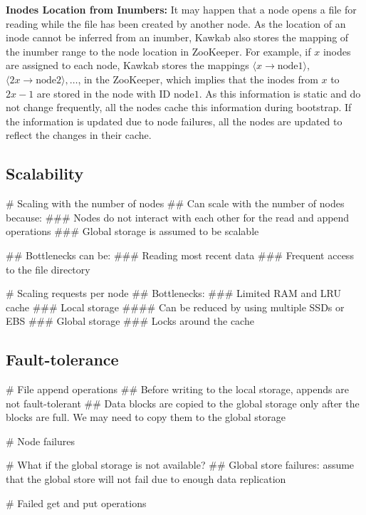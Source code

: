 \documentclass[]{article}
\newcommand{\subtopic}[1]{\vspace{1.5pt} \noindent \textbf{#1}}
\begin{document}
\subtopic{Inodes Location from Inumbers:} It may happen that a node opens a
file for reading while the file has been created by another node. As the
location of an inode cannot be inferred from an inumber, Kawkab also stores the
mapping of the inumber range to the node location in ZooKeeper.  For example,
if $x$ inodes are assigned to each node, Kawkab stores the mappings $\langle x
\to \mathrm{node1} \rangle$, $\langle 2x \to \mathrm{node2} \rangle, \ldots$,
in the ZooKeeper, which implies that the inodes from $x$ to $2x-1$ are stored
in the node with ID $\mathrm{node1}$. As this information is static and do not
change frequently, all the nodes cache this information during bootstrap. If
the information is updated due to node failures, all the nodes are updated to
reflect the changes in their cache.



\subsection{Scalability}

\begin{easylist}[itemize]

  # Scaling with the number of nodes
    ## Can scale with the number of nodes because:
      ### Nodes do not interact with each other for the read and append operations
      ### Global storage is assumed to be scalable

    ## Bottlenecks can be:
      ### Reading most recent data
      ### Frequent access to the file directory

  # Scaling requests per node
    ## Bottlenecks:
      ### Limited RAM and LRU cache
      ### Local storage
        #### Can be reduced by using multiple SSDs or EBS
      ### Global storage
      ### Locks around the cache

\end{easylist}

\subsection{Fault-tolerance}

\begin{easylist}[itemize]

# File append operations
  ## Before writing to the local storage, appends are not fault-tolerant
  ## Data blocks are copied to the global storage only after the blocks are full. We may need to copy
     them to the global storage

# Node failures

# What if the global storage is not available?
  ## Global store failures: assume that the global store will not fail due to enough data replication

# Failed get and put operations


\end{easylist}
\end{document}
